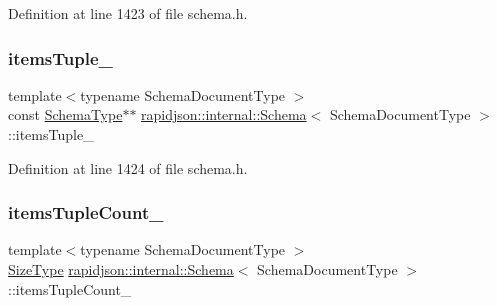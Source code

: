 Definition at line 1423 of file schema.\+h.

\mbox{\label{classrapidjson_1_1internal_1_1_schema_a19125ba0e545f043d5657524c7129a4d}} 
\subsubsection{\texorpdfstring{itemsTuple\_}{itemsTuple\_}}
{\footnotesize\ttfamily template$<$typename Schema\+Document\+Type $>$ \\
const \mbox{\hyperlink{classrapidjson_1_1internal_1_1_schema_a62e03be17971648a9d614244ffcb0f10}{Schema\+Type}}$\ast$$\ast$ \mbox{\hyperlink{classrapidjson_1_1internal_1_1_schema}{rapidjson\+::internal\+::\+Schema}}$<$ Schema\+Document\+Type $>$\+::items\+Tuple\+\_\+\hspace{0.3cm}{\ttfamily [private]}}



Definition at line 1424 of file schema.\+h.

\mbox{\label{classrapidjson_1_1internal_1_1_schema_ad8031fa714cfb3c798393d026180e337}} 
\subsubsection{\texorpdfstring{itemsTupleCount\_}{itemsTupleCount\_}}
{\footnotesize\ttfamily template$<$typename Schema\+Document\+Type $>$ \\
\mbox{\hyperlink{namespacerapidjson_a44eb33eaa523e36d466b1ced64b85c84}{Size\+Type}} \mbox{\hyperlink{classrapidjson_1_1internal_1_1_schema}{rapidjson\+::internal\+::\+Schema}}$<$ Schema\+Document\+Type $>$\+::items\+Tuple\+Count\+\_\+\hspace{0.3cm}{\ttfamily [private]}}



